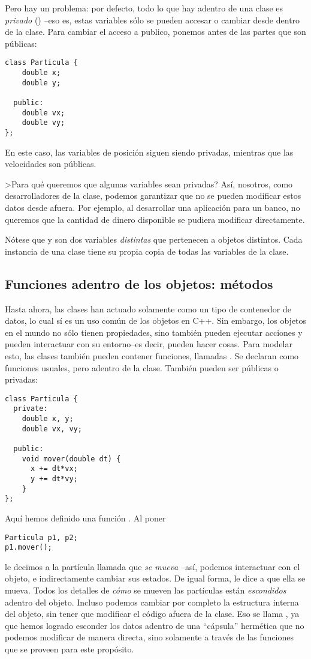 Pero hay un problema: por defecto, todo lo que hay adentro de una
clase es \emph{privado} () --eso es, estas variables sólo se pueden accesar o
cambiar desde dentro de la clase. 
Para cambiar el acceso a publico, ponemos 
antes de las partes que son públicas:
\begin{lstlisting}
class Particula {
    double x;
    double y;

  public:
    double vx;
    double vy;
};  
\end{lstlisting}
En este caso, las variables de posición siguen siendo privadas, mientras que las velocidades son públicas.

>Para qué queremos que algunas variables sean privadas? Así, nosotros, como desarrolladores de la clase, podemos garantizar que no se pueden modificar estos datos desde afuera. Por ejemplo, al desarrollar una aplicación para un banco, no queremos que la cantidad de dinero disponible se pudiera modificar directamente.

Nótese que  y  son dos variables \emph{distintas} que pertenecen a
objetos distintos.  Cada instancia de una clase tiene su propia copia
de todas las variables de la clase.

\subsection{Funciones adentro de los objetos: métodos}
Hasta ahora, las clases han actuado solamente como un tipo de contenedor de datos, lo cual sí es un uso común de los objetos en C++.
Sin embargo, los objetos en el mundo no sólo tienen propiedades, sino también pueden ejecutar acciones y pueden interactuar con su entorno--es decir, pueden hacer cosas. Para modelar esto, las clases también pueden contener funciones, llamadas . Se declaran como funciones usuales, pero adentro de la clase. También pueden ser públicas o privadas:
\begin{lstlisting}
class Particula {
  private:
    double x, y;
    double vx, vy;

  public:
    void mover(double dt) {
      x += dt*vx;
      y += dt*vy;
    }
};  
\end{lstlisting}
Aquí hemos definido una función . Al poner
\begin{lstlisting}
Particula p1, p2;
p1.mover();
\end{lstlisting}
le decimos a la partícula llamada  que \emph{se mueva} --así, podemos interactuar con el objeto, e indirectamente cambiar sus estados. De igual forma,  le dice a  que ella se mueva.
Todos los detalles de \emph{cómo} se
mueven las partículas están \emph{escondidos} adentro del objeto.
Incluso podemos cambiar por completo la estructura interna del objeto, sin tener que modificar el código afuera de la clase. Eso se llama , ya que hemos logrado esconder los datos adentro de una ``cápsula'' hermética que no podemos modificar de manera directa, sino solamente a través de las funciones que se proveen para este propósito.

